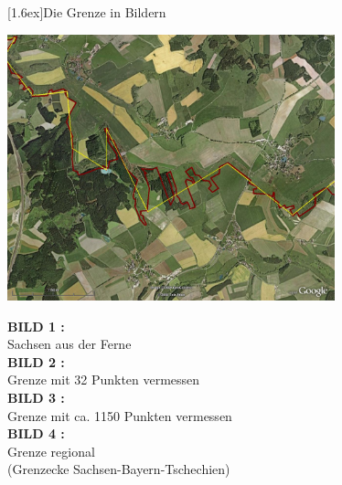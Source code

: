 \documentclass[final]{beamer}
\newlength{\columnheight}
\newlength{\marginw}
\newlength{\tw}
\newlength{\colw}
\newenvironment{myTwoColPoster}{%
  \begin{minipage}[t]{\textwidth}%
    \hspace*{\marginw}%
    \hspace*{9.5bp}%
    \begin{minipage}[t]{\tw}}%
  {\end{minipage}%
   \hspace*{\marginw}%
   \end{minipage}}
\newenvironment{myCol}%
    {\begin{minipage}[t][\columnheight][t]{\colw}}%
    {\end{minipage}}
\newenvironment{textblock}[1]%
    {\begin{block}{\rule[-0.6ex]{0pt}{2.4ex}\raisebox{-0.25ex}[1.6ex]{#1}}%
     \vspace*{5mm}}%
    {\vspace*{5mm}\end{block}}
\begin{document}
\begin{frame}[t]{}
\begin{myTwoColPoster}
\begin{myCol}
\begin{textblock}{Die Grenze in Bildern}
\begin{minipage}[c]{0.75\textwidth}
\begin{center}
        \includegraphics[width=0.71\textwidth]{maps/example}
      \end{center}
    \end{minipage}\hfill
    \begin{minipage}[c]{0.24\textwidth}
      \centering \Large
      \textbf{BILD 1 :}\\Sachsen aus der Ferne\\\vspace*{13.5cm}
      \textbf{BILD 2 :}\\Grenze mit 32 Punkten vermessen\\\vspace*{13.5cm}
      \textbf{BILD 3 :}\\Grenze mit ca. 1150 Punkten vermessen\\\vspace*{13.0cm}
      \textbf{BILD 4 :}\\Grenze regional\\{\normalsize(Grenzecke Sachsen-Bayern-Tschechien)}
    \end{minipage}


   \end{textblock}


\end{myCol}%
\end{myTwoColPoster}
\end{frame}
\end{document}
